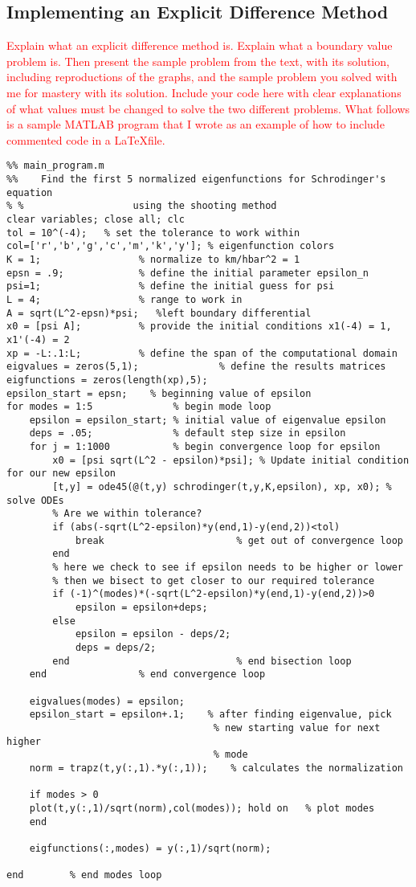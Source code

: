\documentclass{article}
\newcommand{\red}[1]{\textcolor{red}{#1}}
\begin{document}
\subsection{Implementing an Explicit Difference Method}
\red{Explain what an explicit difference method is. Explain what a boundary value problem is. Then present the sample problem from the text, with its solution, including reproductions of the graphs, and the sample problem you solved with me for mastery with its solution. Include your code here with clear explanations of what values must be changed to solve the two different problems. What follows is a sample MATLAB program that I wrote as an example of how to include commented code in a \LaTeX file.}
\begin{verbatim}
%% main_program.m
%%    Find the first 5 normalized eigenfunctions for Schrodinger's equation 
% %                   using the shooting method
clear variables; close all; clc
tol = 10^(-4);   % set the tolerance to work within
col=['r','b','g','c','m','k','y']; % eigenfunction colors
K = 1;                 % normalize to km/hbar^2 = 1
epsn = .9;             % define the initial parameter epsilon_n
psi=1;                 % define the initial guess for psi
L = 4;                 % range to work in
A = sqrt(L^2-epsn)*psi;   %left boundary differential
x0 = [psi A];          % provide the initial conditions x1(-4) = 1, x1'(-4) = 2
xp = -L:.1:L;          % define the span of the computational domain
eigvalues = zeros(5,1);              % define the results matrices
eigfunctions = zeros(length(xp),5);
epsilon_start = epsn;    % beginning value of epsilon
for modes = 1:5              % begin mode loop
    epsilon = epsilon_start; % initial value of eigenvalue epsilon
    deps = .05;              % default step size in epsilon
    for j = 1:1000           % begin convergence loop for epsilon
        x0 = [psi sqrt(L^2 - epsilon)*psi]; % Update initial condition for our new epsilon
        [t,y] = ode45(@(t,y) schrodinger(t,y,K,epsilon), xp, x0); % solve ODEs
        % Are we within tolerance?
        if (abs(-sqrt(L^2-epsilon)*y(end,1)-y(end,2))<tol)
            break                       % get out of convergence loop
        end
        % here we check to see if epsilon needs to be higher or lower
        % then we bisect to get closer to our required tolerance
        if (-1)^(modes)*(-sqrt(L^2-epsilon)*y(end,1)-y(end,2))>0     
            epsilon = epsilon+deps;    
        else
            epsilon = epsilon - deps/2;
            deps = deps/2;
        end                             % end bisection loop
    end                % end convergence loop
    
    eigvalues(modes) = epsilon;
    epsilon_start = epsilon+.1;    % after finding eigenvalue, pick
                                    % new starting value for next higher
                                    % mode
    norm = trapz(t,y(:,1).*y(:,1));    % calculates the normalization
    
    if modes > 0
    plot(t,y(:,1)/sqrt(norm),col(modes)); hold on   % plot modes
    end
    
    eigfunctions(:,modes) = y(:,1)/sqrt(norm);
    
end        % end modes loop
\end{verbatim}
\end{document}
